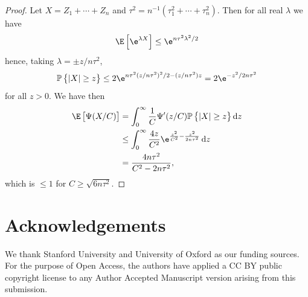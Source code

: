\documentclass[11pt]{amsart}
\renewcommand{\P}{\mathbb{P}}
\begin{document}
\begin{proof}
	Let $X=Z_1+\cdots + Z_n$ and $\tau^2 = n^{-1} (\tau^2_1 + \cdots + \tau^2_n)$. Then for all real $\lambda$ we have
	$$
	\E\left[ \e^{\lambda X} \right] \le \e^{n\tau^2 \lambda^2/2}
	$$
	hence, taking $\lambda= \pm z/n\tau^2$,
	$$
	\P\left\{ |X| \ge z \right\} \le 2\e^{n\tau^2 (z/n\tau^2)^2/2 - (z/n\tau^2) z} = 2\e^{-z^2/2n\tau^2}
	$$
	for all $z >0$. We have then
	\begin{align*}
		\E\left[ \Psi(X/C) \right] & = \int_0^\infty \frac{1}{C} \Psi'(z/C) \P\left\{ |X| \ge z \right\} \dif z\\
		&\le \int_0^\infty \frac{4z}{C^2} \e^{\frac{z^2}{C^2} - \frac{z^2}{2n\tau^2} }\dif z\\
		& = \frac{4n\tau^2}{C^2 - 2n\tau^2},
	\end{align*}
	which is $\le 1$ for $C\ge \sqrt{6n\tau^2}$.
\end{proof}

\section*{Acknowledgements}
We thank Stanford University and University of Oxford as our funding sources.
For the purpose of Open Access, the authors have applied a CC BY public copyright license to any Author Accepted Manuscript version arising from this submission.



\end{document}
